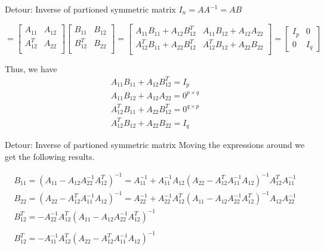 \documentclass{beamer}
\begin{document}
\begin{frame}{Detour: Inverse of partioned symmetric matrix}
	$I_n = AA^{-1} = AB$
	
	$=\begin{bmatrix}
	A_{11} & A_{12}\\
	A_{12}^T & A_{22} \\
	\end{bmatrix} \begin{bmatrix}
	B_{11} & B_{12}\\
	B_{12}^T & B_{22} \\
	\end{bmatrix}
	= \begin{bmatrix}
	A_{11}B_{11} +A_{12}B_{12}^T & A_{11}B_{12} + A_{12}A_{22}\\
	A_{12}^TB_{11} + A_{22}B_{12}^T & A_{12}^TB_{12} + A_{22}B_{22}  \\
	\end{bmatrix} = \begin{bmatrix}
	I_p & 0 \\
	0 & I_q
	\end{bmatrix}$
	
	Thus, we have
	\begin{gather}
	A_{11}B_{11} +A_{12}B_{12}^T = I_p\\
	A_{11}B_{12} + A_{12}A_{22} = 0^{p\times q}\\
	A_{12}^TB_{11} + A_{22}B_{12}^T = 0^{q\times p}\\
	A_{12}^TB_{12} + A_{22}B_{22} = I_q
	\end{gather}
\end{frame}

\begin{frame}{Detour: Inverse of partioned symmetric matrix}
	Moving the expressions around we get the following results.
	
	\begin{gather}
	B_{11} = (A_{11} - A_{12}A_{22}^{-1}A_{12}^T)^{-1} = A_{11}^{-1} + A_{11}^{-1}A_{12}(A_{22} - A_{12}^TA_{11}^{-1}A_{12})^{-1}A_{12}^TA_{11}^{-1}\\
	B_{22} = (A_{22} - A_{12}^TA_{11}^{-1}A_{12})^{-1} = A_{22}^{-1} + A_{22}^{-1}A_{12}^T(A_{11} - A_{12}A_{22}^{-1}A_{12}^T)^{-1}A_{12}A_{22}^{-1}\\
	B_{12}^T = - A_{22}^{-1}A_{12}^T ( A_{11} - A_{12} A_{22}^{-1} A_{12}^T)^{-1}\\\\
	B_{12}^T = - A_{11}^{-1}A_{12}^T ( A_{22} - A_{12} ^TA_{11}^{-1} A_{12})^{-1}
	\end{gather}
\end{frame}
\end{document}

